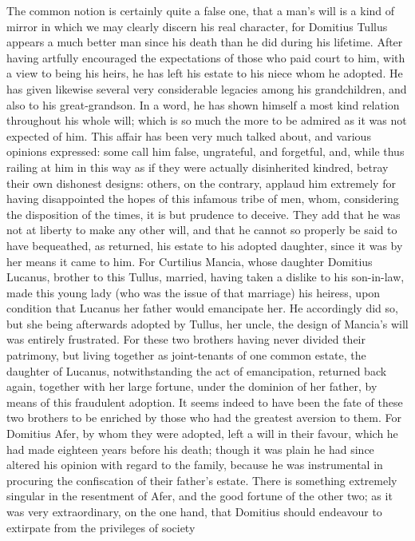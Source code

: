 The common notion is certainly quite a false one, that a man's will is a
kind of mirror in which we may clearly discern his real character, for
Domitius Tullus appears a much better man since his death than he did
during his lifetime. After having artfully encouraged the expectations of
those who paid court to him, with a view to being his heirs, he has left
his estate to his niece whom he adopted. He has given likewise several
very considerable legacies among his grandchildren, and also to his
great-grandson. In a word, he has shown himself a most kind relation
throughout his whole will; which is so much the more to be admired as it
was not expected of him. This affair has been very much talked about, and
various opinions expressed: some call him false, ungrateful, and
forgetful, and, while thus railing at him in this way as if they were
actually disinherited kindred, betray their own dishonest designs: others,
on the contrary, applaud him extremely for having disappointed the hopes
of this infamous tribe of men, whom, considering the disposition of the
times, it is but prudence to deceive. They add that he was not at liberty
to make any other will, and that he cannot so properly be said to have
bequeathed, as returned, his estate to his adopted daughter, since it was
by her means it came to him. For Curtilius Mancia, whose daughter Domitius
Lucanus, brother to this Tullus, married, having taken a dislike to his
son-in-law, made this young lady (who was the issue of that marriage) his
heiress, upon condition that Lucanus her father would emancipate her. He
accordingly did so, but she being afterwards adopted by Tullus, her uncle,
the design of Mancia's will was entirely frustrated. For these two
brothers having never divided their patrimony, but living together as
joint-tenants of one common estate, the daughter of Lucanus,
notwithstanding the act of emancipation, returned back again, together
with her large fortune, under the dominion of her father, by means of this
fraudulent adoption. It seems indeed to have been the fate of these two
brothers to be enriched by those who had the greatest aversion to them.
For Domitius Afer, by whom they were adopted, left a will in their favour,
which he had made eighteen years before his death; though it was plain he
had since altered his opinion with regard to the family, because he was
instrumental in procuring the confiscation of their father's estate. There
is something extremely singular in the resentment of Afer, and the good
fortune of the other two; as it was very extraordinary, on the one hand,
that Domitius should endeavour to extirpate from the privileges of society

